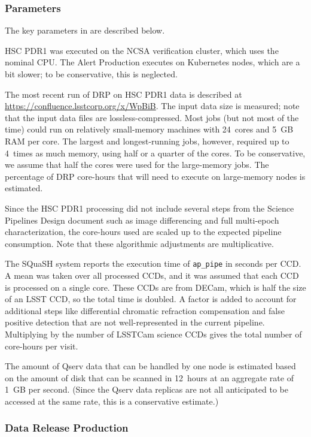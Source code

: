 \subsubsection{Parameters}
The key parameters in  are described below.

HSC PDR1 was executed on the NCSA verification cluster, which uses the nominal CPU.
The Alert Production executes on Kubernetes nodes, which are a bit slower; to be conservative, this is neglected.

The most recent run of DRP on HSC PDR1 data is described at \url{https://confluence.lsstcorp.org/x/WpBiB}.
The input data size is measured; note that the input data files are lossless-compressed.
Most jobs (but not most of the time) could run on relatively small-memory machines with 24~cores and 5~GB RAM per core.
The largest and longest-running jobs, however, required up to 4~times as much memory, using half or a quarter of the cores.
To be conservative, we assume that half the cores were used for the large-memory jobs.
The percentage of DRP core-hours that will need to execute on large-memory nodes is estimated.

Since the HSC PDR1 processing did not include several steps from the Science Pipelines Design document  such as image differencing and full multi-epoch characterization, the core-hours used are scaled up to the expected pipeline consumption.
Note that these algorithmic adjustments are multiplicative.

The SQuaSH system reports the execution time of \texttt{ap\_pipe} in seconds per CCD.
A mean was taken over all processed CCDs, and it was assumed that each CCD is processed on a single core.
These CCDs are from DECam, which is half the size of an LSST CCD, so the total time is doubled.
A factor is added to account for additional steps like differential chromatic refraction compensation and false positive detection that are not well-represented in the current pipeline.
Multiplying by the number of LSSTCam science CCDs gives the total number of core-hours per visit.

The amount of Qserv data that can be handled by one node is estimated based on the amount of disk that can be scanned in 12~hours at an aggregate rate of 1~GB per second.
(Since the Qserv data replicas are not all anticipated to be accessed at the same rate, this is a conservative estimate.)

\subsubsection{Data Release Production}

